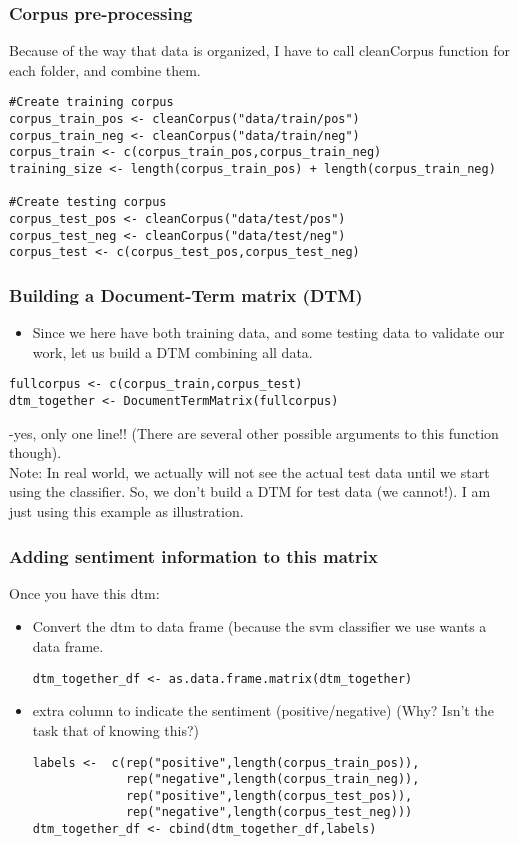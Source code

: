 \documentclass{beamer}
\begin{document}
\begin{frame}[fragile]
\frametitle{Corpus pre-processing}
Because of the way that data is organized, I have to call cleanCorpus function for each folder, and combine them.
\footnotesize
\begin{verbatim}
#Create training corpus
corpus_train_pos <- cleanCorpus("data/train/pos")
corpus_train_neg <- cleanCorpus("data/train/neg") 
corpus_train <- c(corpus_train_pos,corpus_train_neg)
training_size <- length(corpus_train_pos) + length(corpus_train_neg)

#Create testing corpus
corpus_test_pos <- cleanCorpus("data/test/pos")
corpus_test_neg <- cleanCorpus("data/test/neg") 
corpus_test <- c(corpus_test_pos,corpus_test_neg) 
\end{verbatim}
\end{frame}

\begin{frame}[fragile]
\frametitle{Building a Document-Term matrix (DTM)}
\begin{itemize}
\item Since we here have both training data, and some testing data to validate our work, let us build a DTM combining all data. 
\end{itemize} \footnotesize
\begin{verbatim}
fullcorpus <- c(corpus_train,corpus_test)
dtm_together <- DocumentTermMatrix(fullcorpus)
\end{verbatim} \small
-yes, only one line!! (There are several other possible arguments to this function though).
\\ Note: In real world, we actually will not see the actual test data until we start using the classifier. So, we don't build a DTM for test data (we cannot!). I am just using this example as illustration. 
\end{frame}

\begin{frame}[fragile]
\frametitle{Adding sentiment information to this matrix}
Once you have this dtm: \small
\begin{itemize}
\item Convert the dtm to data frame (because the svm classifier we use wants a data frame. \footnotesize
\begin{verbatim} 
dtm_together_df <- as.data.frame.matrix(dtm_together) 
\end{verbatim} \small
\item extra column to indicate the sentiment (positive/negative) (Why? Isn't the task that of knowing this?) \pause
\footnotesize
\begin{verbatim}
labels <-  c(rep("positive",length(corpus_train_pos)), 
             rep("negative",length(corpus_train_neg)),
             rep("positive",length(corpus_test_pos)),
             rep("negative",length(corpus_test_neg)))
dtm_together_df <- cbind(dtm_together_df,labels)
\end{verbatim}
\end{itemize}
\end{frame}
\end{document}
